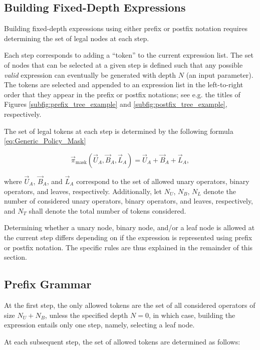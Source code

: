 \documentclass[12pt]{iopart}
\begin{document}
\subsection{Building Fixed-Depth Expressions}
Building fixed-depth expressions using either prefix or postfix notation requires determining the set of legal nodes at each step. 
\par Each step corresponds to adding a ``token'' to the current expression list. The set of nodes that can be selected at a given step is defined such that any possible \emph{valid} expression can eventually be generated with depth $N$ (an input parameter). The tokens are selected and appended to an expression list in the left-to-right order that they appear in the prefix or postfix notations; see e.g. the titles of Figures \ref{subfig:prefix_tree_example} and \ref{subfig:postfix_tree_example}, respectively. 
\par The set of legal tokens at each step is determined by the following formula \ref{eq:Generic_Policy_Mask}

\begin{equation}
    \vec{\pi}_{\mathrm{mask}} \left(\vec{U}_{A}, \vec{B}_{A}, \vec{L}_{A}\right) = 
\vec{U}_{A}  + \vec{B}_{A} +\vec{L}_{A},
\label{eq:Generic_Policy_Mask}
\end{equation}

where $\vec{U}_{A}$, $ \vec{B}_{A}$, and $\vec{L}_{A}$ correspond to the set of allowed unary operators, binary operators, and leaves, respectively. Additionally, let $N_U$, $N_B$, $N_L$ denote the number of considered unary operators, binary operators, and leaves, respectively,  and $N_{T}$ shall denote the total number of tokens considered.

Determining whether a unary node, binary node, and/or a leaf node is allowed at the current step differs depending on if the expression is represented using prefix or postfix notation. The specific rules are thus explained in the remainder of this section.

\subsection{Prefix Grammar}\label{subsec:prefix_grammar}
At the first step, the only allowed tokens are the set of all considered operators of size $N_U + N_B$, unless the specified depth $N=0$, in which case, building the expression entails only one step, namely, selecting a leaf node.
\par At each subsequent step, the set of allowed tokens are determined as follows:
\end{document}
